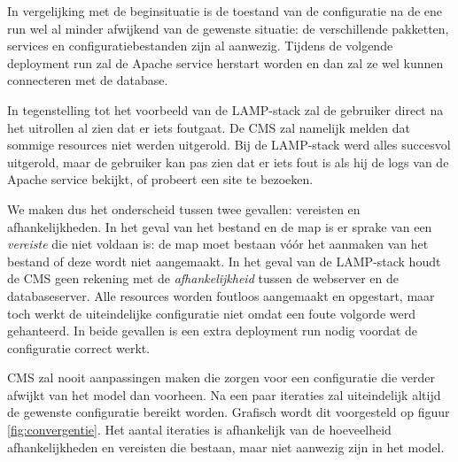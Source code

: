 In vergelijking met de beginsituatie is de toestand van de configuratie na de ene run wel al minder afwijkend van de gewenste situatie:
de verschillende pakketten, services en configuratiebestanden zijn al aanwezig.
Tijdens de volgende deployment run zal de Apache service herstart worden en dan zal ze wel kunnen connecteren met de database.


%

In tegenstelling tot het voorbeeld van de LAMP-stack zal de gebruiker direct na het uitrollen al zien dat er iets foutgaat.
De CMS zal namelijk melden dat sommige resources niet werden uitgerold.
Bij de LAMP-stack werd alles succesvol uitgerold, maar de gebruiker kan pas zien dat er iets fout is als hij de logs van de Apache service bekijkt, of probeert een site te bezoeken.

We maken dus het onderscheid tussen twee gevallen: vereisten en afhankelijkheden.
In het geval van het bestand en de map is er sprake van een \textit{vereiste} die niet voldaan is: de map moet bestaan v\'o\'or het aanmaken van het bestand of deze wordt niet aangemaakt.
In het geval van de LAMP-stack houdt de CMS geen rekening met de \textit{afhankelijkheid} tussen de webserver en de databaseserver.
Alle resources worden foutloos aangemaakt en opgestart, maar toch werkt de uiteindelijke configuratie niet omdat een foute volgorde werd gehanteerd.
In beide gevallen is een extra deployment run nodig voordat de configuratie correct werkt.

CMS zal nooit aanpassingen maken die zorgen voor een configuratie die verder afwijkt van het model dan voorheen.
Na een paar iteraties zal uiteindelijk altijd de gewenste configuratie bereikt worden. 
Grafisch wordt dit voorgesteld op figuur \ref{fig:convergentie}.
Het aantal iteraties is afhankelijk van de hoeveelheid afhankelijkheden en vereisten die bestaan, maar niet aanwezig zijn in het model.

